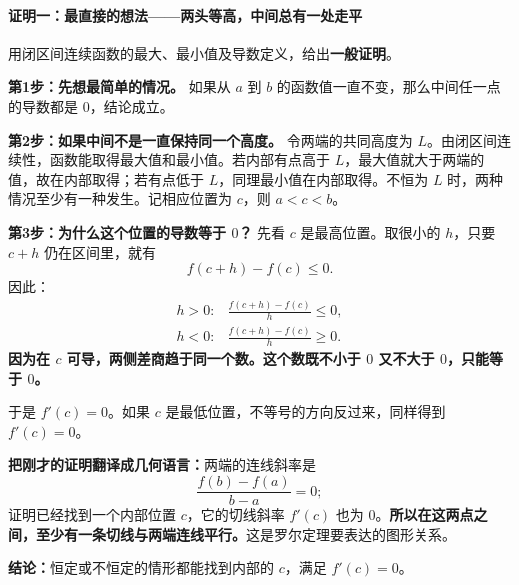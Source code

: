 \clearpage
\begin{proofbox}
\par\medskip
\noindent\begin{minipage}{\linewidth}
\paragraph{证明一：最直接的想法——两头等高，中间总有一处走平}
\begin{center}\end{center}
\end{minipage}\par\medskip

用闭区间连续函数的最大、最小值及导数定义，给出\textbf{一般证明}。

\textbf{第1步：先想最简单的情况。}
如果从 $a$ 到 $b$ 的函数值一直不变，那么中间任一点的导数都是 $0$，结论成立。

\textbf{第2步：如果中间不是一直保持同一个高度。}
令两端的共同高度为 $L$。由闭区间连续性，函数能取得最大值和最小值。若内部有点高于 $L$，最大值就大于两端的值，故在内部取得；若有点低于 $L$，同理最小值在内部取得。不恒为 $L$ 时，两种情况至少有一种发生。记相应位置为 $c$，则 $a<c<b$。

\textbf{第3步：为什么这个位置的导数等于 $0$？}
先看 $c$ 是最高位置。取很小的 $h$，只要 $c+h$ 仍在区间里，就有
\[
f(c+h)-f(c)\le0.
\]
因此：
\[
\begin{array}{ll}
h>0:&\displaystyle\frac{f(c+h)-f(c)}{h}\le0,\\[6pt]
h<0:&\displaystyle\frac{f(c+h)-f(c)}{h}\ge0.
\end{array}
\]
\textbf{因为在 $c$ 可导，两侧差商趋于同一个数。这个数既不小于 $0$ 又不大于 $0$，只能等于 $0$。}

于是 $f'(c)=0$。如果 $c$ 是最低位置，不等号的方向反过来，同样得到 $f'(c)=0$。

\textbf{把刚才的证明翻译成几何语言：}两端的连线斜率是
\[
\frac{f(b)-f(a)}{b-a}=0;
\]
证明已经找到一个内部位置 $c$，它的切线斜率 $f'(c)$ 也为 $0$。\textbf{所以在这两点之间，至少有一条切线与两端连线平行。}这是罗尔定理要表达的图形关系。

\textbf{结论：}恒定或不恒定的情形都能找到内部的 $c$，满足 $f'(c)=0$。
\end{proofbox}
\clearpage
